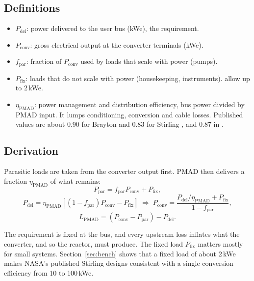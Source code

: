 \documentclass[11pt]{article}
\numberwithin{equation}{section}
\numberwithin{table}{section}
\newcommand{\Pdel}{P_\text{del}}
\newcommand{\Pconv}{P_\text{conv}}
\begin{document}
\subsection{Definitions}
\begin{itemize}
  \item $\Pdel$: power delivered to the user bus (kWe), the requirement.
  \item $\Pconv$: gross electrical output at the converter terminals (kWe).
  \item $f_\text{par}$: fraction of $\Pconv$ used by loads that scale with power (pumps).
  \item $P_\text{fix}$: loads that do not scale with power (housekeeping,
        instruments). \textcite{mason2025trades} allow up to 2\,kWe.
  \item $\eta_\text{PMAD}$: power management and distribution efficiency, bus power
        divided by PMAD input. It lumps conditioning, conversion and cable losses.
        Published values are about 0.90 for Brayton and 0.83 for Stirling
        \cite{mason2025trades}, and 0.87 in \cite{oleson2022deployable}.
\end{itemize}

\subsection{Derivation}
Parasitic loads are taken from the converter output first. PMAD then delivers a
fraction $\eta_\text{PMAD}$ of what remains:
\begin{equation}
  P_\text{par} = f_\text{par}\Pconv + P_\text{fix},
  \label{eq:ppar}
\end{equation}
\begin{equation}
  \Pdel = \eta_\text{PMAD}\left[(1-f_\text{par})\Pconv - P_\text{fix}\right]
  \;\Longrightarrow\;
  \Pconv = \frac{\Pdel/\eta_\text{PMAD} + P_\text{fix}}{1-f_\text{par}},
  \label{eq:pconv}
\end{equation}
\begin{equation}
  L_\text{PMAD} = (\Pconv - P_\text{par}) - \Pdel .
  \label{eq:lpmad}
\end{equation}

\begin{physics}
The requirement is fixed at the bus, and every upstream loss inflates what the
converter, and so the reactor, must produce. The fixed load $P_\text{fix}$ matters
mostly for small systems. Section~\ref{sec:bench} shows that a fixed load of about
2\,kWe makes NASA's published Stirling designs consistent with a single conversion
efficiency from 10 to 100\,kWe.
\end{physics}
\end{document}
